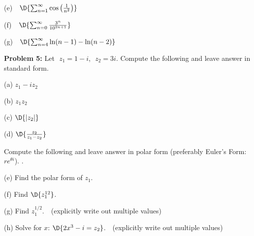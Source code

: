 \documentclass[12pt]{amsart}
\numberwithin{equation}{section}
\begin{document}
\vspace{2.0cm}

(e) \,\, $\D{\sum_{n=1}^\infty \cos\left(\frac{1}{n^2}\right)}$

\vspace{2.0cm}

(f) \,\, $\D{ \sum_{n=0}^{\infty} \frac{3^n}{10^{2n+1}}}$

\vspace{2.0cm}

(g) \,\, $\D{\sum_{n=4}^\infty \ln(n-1) - \ln(n-2)}$

\vspace{0.2cm}

\thispagestyle{empty}
\newpage
\thispagestyle{empty}

{\bf Problem 5:} Let \,\,$z_1 = 1-i$,\,\, $z_2 = 3i$.  \quad Compute the following and leave answer in standard form.

\vspace{0.1cm}

(a) \quad $z_1 - iz_2$

\vspace{1.0cm}

(b) \quad $z_1 z_2$

\vspace{1.5cm}

(c) \quad $\D{|z_2|}$

\vspace{1.5cm}

(d) \quad $\D{\frac{z_2}{z_1-z_2}}$

\vspace{2.5cm}

Compute the following and leave answer in polar form (preferably Euler's Form: $re^{\theta i}$). .

\vspace{0.1cm}

(e) Find the polar form of $z_1$.

\vspace{3.0cm}

(f) Find $\D{z_1^{12}}$.

\vspace{3.0cm}

(g) Find $z_1^{1/2}$. \,\, (explicitly write out multiple values)

\vspace{3.0cm}

(h) Solve for $x$: \quad $\D{2x^3-i=z_2}$.  \,\, (explicitly write out multiple values)
 
\thispagestyle{empty}
\newpage
\thispagestyle{empty}
\end{document}

